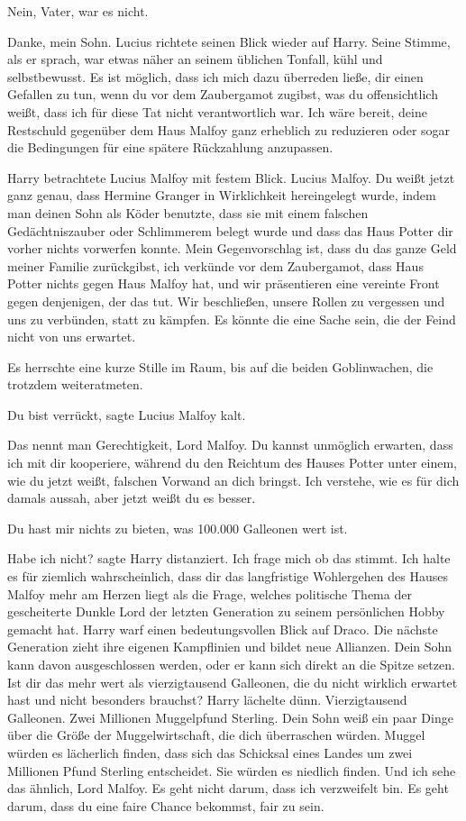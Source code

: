 \glqq Nein, Vater, war es nicht.\grqq{}

\glqq Danke, mein Sohn.\grqq{} Lucius richtete seinen Blick wieder auf Harry.
Seine Stimme, als er sprach, war etwas näher an seinem üblichen Tonfall, kühl
und selbstbewusst. \glqq Es ist möglich, dass ich mich dazu überreden ließe, dir
einen Gefallen zu tun, wenn du vor dem Zaubergamot zugibst, was du
offensichtlich weißt, dass ich für diese Tat nicht verantwortlich war. Ich wäre
bereit, deine Restschuld gegenüber dem Haus Malfoy ganz erheblich zu reduzieren
oder sogar die Bedingungen für eine spätere Rückzahlung anzupassen.\grqq{}

Harry betrachtete Lucius Malfoy mit festem Blick. \glqq Lucius Malfoy. Du weißt
jetzt ganz genau, dass Hermine Granger in Wirklichkeit hereingelegt wurde, indem
man deinen Sohn als Köder benutzte, dass sie mit einem falschen Gedächtniszauber
oder Schlimmerem belegt wurde und dass das Haus Potter dir vorher nichts
vorwerfen konnte. Mein Gegenvorschlag ist, dass du das ganze Geld meiner Familie
zurückgibst, ich verkünde vor dem Zaubergamot, dass Haus Potter nichts gegen
Haus Malfoy hat, und wir präsentieren eine vereinte Front gegen denjenigen, der
das tut. Wir beschließen, unsere Rollen zu vergessen und uns zu verbünden, statt
zu kämpfen. Es könnte die eine Sache sein, die der Feind nicht von uns
erwartet.\grqq{}

Es herrschte eine kurze Stille im Raum, bis auf die beiden Goblinwachen, die
trotzdem weiteratmeten.

\glqq Du bist verrückt\grqq{}, sagte Lucius Malfoy kalt.

\glqq Das nennt man Gerechtigkeit, Lord Malfoy. Du kannst unmöglich erwarten,
dass ich mit dir kooperiere, während du den Reichtum des Hauses Potter unter
einem, wie du jetzt weißt, falschen Vorwand an dich bringst. Ich verstehe, wie
es für dich damals aussah, aber jetzt weißt du es besser.\grqq{}

\glqq Du hast mir nichts zu bieten, was 100.000 Galleonen wert ist.\grqq{}

\glqq Habe ich nicht?\grqq{} sagte Harry distanziert. \glqq Ich frage mich ob
das stimmt. Ich halte es für ziemlich wahrscheinlich, dass dir das langfristige
Wohlergehen des Hauses Malfoy mehr am Herzen liegt als die Frage, welches
politische Thema der gescheiterte Dunkle Lord der letzten Generation zu seinem
persönlichen Hobby gemacht hat.\grqq{} Harry warf einen bedeutungsvollen Blick
auf Draco. \glqq Die nächste Generation zieht ihre eigenen Kampflinien und
bildet neue Allianzen. Dein Sohn kann davon ausgeschlossen werden, oder er kann
sich direkt an die Spitze setzen. Ist dir das mehr wert als vierzigtausend
Galleonen, die du nicht wirklich erwartet hast und nicht besonders
brauchst?\grqq{} Harry lächelte dünn. \glqq Vierzigtausend Galleonen. Zwei
Millionen Muggelpfund Sterling. Dein Sohn weiß ein paar Dinge über die Größe der
Muggelwirtschaft, die dich überraschen würden. Muggel würden es lächerlich
finden, dass sich das Schicksal eines Landes um zwei Millionen Pfund Sterling
entscheidet. Sie würden es niedlich finden. Und ich sehe das ähnlich, Lord
Malfoy. Es geht nicht darum, dass ich verzweifelt bin. Es geht darum, dass du
eine faire Chance bekommst, fair zu sein.\grqq{}

